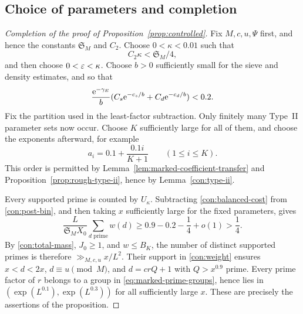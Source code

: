 \subsection{Choice of parameters and completion}

\begin{proof}[Completion of the proof of Proposition~\ref{prop:controlled}]
Fix \(M,c,u,\Psi\) first, and hence the constants
\(\mathfrak S_M\) and \(C_2\).  Choose
\(0<\kappa<0.01\) such that
\[
 C_2\kappa<\mathfrak S_M/4,
\]
and then choose \(0<\varepsilon<\kappa\).  Choose \(b>0\) sufficiently
small for the sieve and density estimates, and so that
\[
 \frac{\mathrm{e}^{-\gamma_E}}b
          (C_s\mathrm{e}^{-c_s/b}+C_d\mathrm{e}^{-c_d/b})<0.2.
\]
Fix the partition used in the least-factor subtraction.  Only
finitely many Type~II parameter sets now occur.  Choose \(K\)
sufficiently large for all of them, and choose the exponents
afterward, for example
\[
 a_i=0.1+\frac{0.1i}{K+1}\qquad(1\le i\le K).
\]
This order is permitted by Lemma~\ref{lem:marked-coefficient-transfer}
and Proposition~\ref{prop:rough-type-ii}, hence by Lemma~\ref{con:type-ii}.

Every supported prime is counted by \(U_\kappa\).
Subtracting \eqref{con:balanced-cost} from \eqref{con:post-bin},
and then taking \(x\) sufficiently large for the fixed parameters,
gives
\[
 \frac{L}{\mathfrak S_M X_0}\sum_{d\text{ prime}}w(d)
       \ge0.9-0.2-\frac14+o(1)>\frac14.
\]
By \eqref{con:total-mass}, \(J_0\ge1\), and \(w\le B_K\),
the number of distinct supported primes is therefore
\(\gg_{M,c,u}x/L^2\).  Their support in \eqref{con:weight}
ensures \(x<d<2x\), \(d\equiv u\pmod M\), and
\(d=crQ+1\) with \(Q>x^{0.9}\) prime.  Every prime factor of
\(r\) belongs to a group in \eqref{eq:marked-prime-groups}, hence lies in
\((\exp(L^{0.1}),\exp(L^{0.3}))\) for all sufficiently large
\(x\).  These are precisely the assertions of the proposition.
\end{proof}
